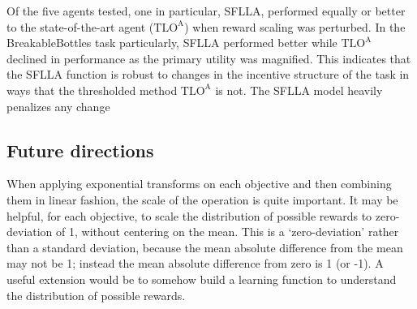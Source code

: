 


Of the five agents tested, one in particular, SFLLA, performed equally or better to the state-of-the-art agent ($\text{TLO}^\text{A}$) when reward scaling was perturbed. In the BreakableBottles task particularly, SFLLA performed better while $\text{TLO}^\text{A}$ declined in performance as the primary utility was magnified. This indicates that the SFLLA function is robust to changes in the incentive structure of the task in ways that the thresholded method $\text{TLO}^\text{A}$ is not. The SFLLA model heavily penalizes any change 



\subsection{Future directions}

When applying exponential transforms on each objective and then combining them in linear fashion, the scale of the operation is quite important. It may be helpful, for each objective, to scale the distribution of possible rewards to zero-deviation of 1, without centering on the mean. This is a `zero-deviation' rather than a standard deviation, because the mean absolute difference from the mean may not be 1; instead the mean absolute difference from zero is 1 (or -1). A useful extension would be to somehow build a learning function to understand the distribution of possible rewards.


